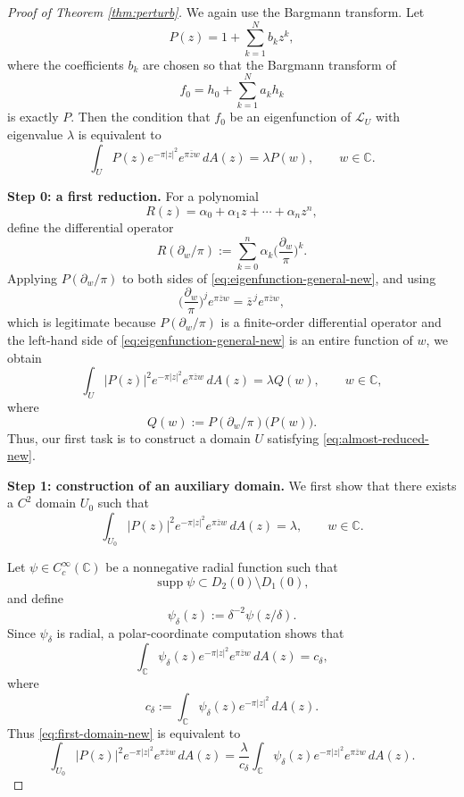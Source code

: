 \documentclass[a4paper,11pt,reqno]{amsart}
\numberwithin{equation}{section}
\theoremstyle{plain} %
\theoremstyle{definition} %
\theoremstyle{remark}
\DeclareMathOperator{\supp}{supp}
\newcommand{\C}{\mathbb{C}}
\begin{document}
\begin{proof}[Proof of Theorem \ref{thm:perturb}]
We again use the Bargmann transform. Let
\[
P(z)=1+\sum_{k=1}^N b_k z^k,
\]
where the coefficients $b_k$ are chosen so that the Bargmann transform of
\[
f_0=h_0+\sum_{k=1}^N a_k h_k
\]
is exactly $P$. Then the condition that $f_0$ be an eigenfunction of $\mathcal{L}_U$ with eigenvalue $\lambda$ is equivalent to
\begin{equation}\label{eq:eigenfunction-general-new}
\int_U P(z)e^{-\pi|z|^2}e^{\pi \overline z w}\,dA(z)=\lambda P(w),
\qquad w\in \C.
\end{equation}

\medskip
\noindent\textbf{Step 0: a first reduction.}
For a polynomial
\[
R(z)=\alpha_0+\alpha_1 z+\cdots+\alpha_n z^n,
\]
define the differential operator
\[
R(\partial_w/\pi):=\sum_{k=0}^n \alpha_k\Big(\frac{\partial_w}{\pi}\Big)^k.
\]
Applying $P(\partial_w/\pi)$ to both sides of \eqref{eq:eigenfunction-general-new}, and using
\[
\Big(\frac{\partial_w}{\pi}\Big)^j e^{\pi \overline z w}=\overline z^{\,j} e^{\pi \overline z w},
\]
which is legitimate because \(P(\partial_w/\pi)\) is a finite-order differential
operator and the left-hand side of \eqref{eq:eigenfunction-general-new} is an
entire function of \(w\),
we obtain
\begin{equation}\label{eq:almost-reduced-new}
\int_U |P(z)|^2 e^{-\pi|z|^2} e^{\pi \overline z w}\,dA(z)=\lambda Q(w),
\qquad w\in\C,
\end{equation}
where
\[
Q(w):=P(\partial_w/\pi)\big(P(w)\big).
\]
Thus, our first task is to construct a domain $U$ satisfying \eqref{eq:almost-reduced-new}.

\medskip
\noindent\textbf{Step 1: construction of an auxiliary domain.}
We first show that there exists a $C^2$ domain $U_0$ such that
\begin{equation}\label{eq:first-domain-new}
\int_{U_0} |P(z)|^2 e^{-\pi|z|^2} e^{\pi \overline z w}\,dA(z)=\lambda,
\qquad w\in\C.
\end{equation}

Let $\psi\in C_c^\infty(\C)$ be a nonnegative radial function such that
\[
\supp \psi \subset D_2(0)\setminus D_1(0),
\]
and define
\[
\psi_\delta(z):=\delta^{-2}\psi(z/\delta).
\]
Since $\psi_\delta$ is radial, a polar-coordinate computation shows that
\[
\int_{\C} \psi_\delta(z)e^{-\pi|z|^2}e^{\pi \overline z w}\,dA(z)=c_\delta,
\]
where
\[
c_\delta:=\int_{\C}\psi_\delta(z)e^{-\pi|z|^2}\,dA(z).
\]
Thus \eqref{eq:first-domain-new} is equivalent to
\begin{equation}\label{eq:second-domain-new}
\int_{U_0} |P(z)|^2 e^{-\pi|z|^2} e^{\pi \overline z w}\,dA(z)
=
\frac{\lambda}{c_\delta}
\int_{\C}\psi_\delta(z)e^{-\pi|z|^2}e^{\pi \overline z w}\,dA(z).
\end{equation}


\end{proof}
\end{document}
